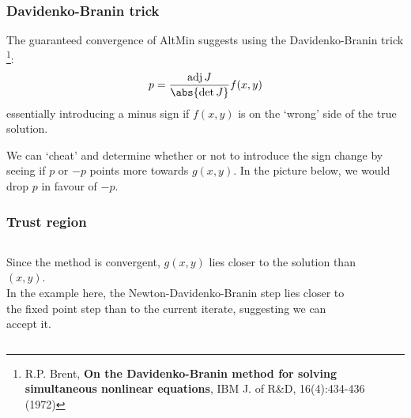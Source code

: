 \documentclass{beamer}
\DeclareMathOperator{\adj}{adj}
\begin{document}
\begin{frame}
\frametitle{Davidenko-Branin trick}

The guaranteed convergence of AltMin suggests using the Davidenko-Branin trick \footnote{R.P. Brent, \textbf{On the Davidenko-Branin method for solving simultaneous nonlinear equations}, IBM J. of R\&D, 16(4):434-436 (1972)}: 
\begin{equation*}
	p = \frac{ \adj J}{\abs{ \det J}} f(x,y)
\end{equation*}
essentially introducing a minus sign if $f(x,y)$ is on the `wrong' side of the true solution.

We can `cheat' and determine whether or not to introduce the sign change by seeing if $p$ or $-p$ points more towards $g(x,y)$.
In the picture below, we would drop $p$ in favour of $-p$.

\begin{figure}
\end{figure}

\end{frame}

\begin{frame}
\frametitle{Trust region}

\begin{columns}
	\begin{column}{0.5\textwidth}
		Since the method is convergent, $g(x,y)$ lies closer to the solution than $(x,y)$.
		\\
		\vspace{1em}
		In the example here, the Newton-Davidenko-Branin step lies closer to the fixed point step than to the current iterate, suggesting we can accept it.
	\end{column}
	\begin{column}{0.5\textwidth}
		\begin{figure}
		\end{figure}
	\end{column}
\end{columns}

\end{frame}
\end{document}
